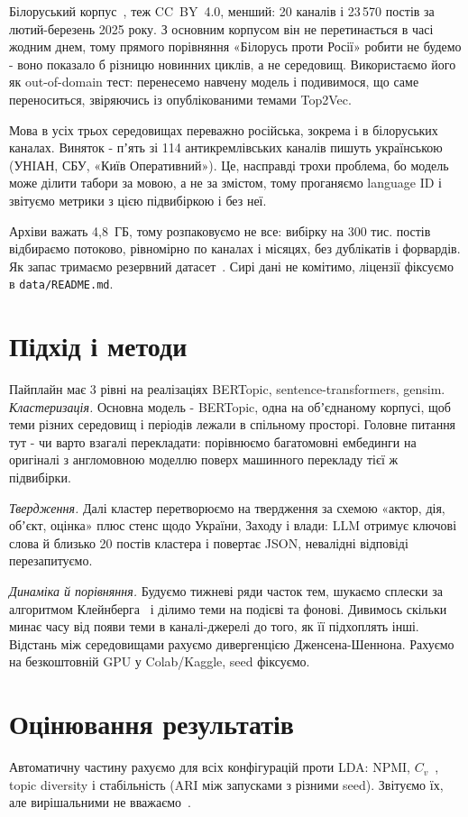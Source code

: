 \documentclass[ukrainian]{ucuproposal}
\begin{document}
Білоруський корпус~\cite{rudnik2026autocrats}, теж CC~BY~4.0, менший: 20
каналів і 23\,570 постів за лютий-березень 2025 року. З основним корпусом
він не перетинається в часі жодним днем, тому прямого порівняння
«Білорусь проти Росії» робити не будемо - воно показало б різницю
новинних циклів, а не середовищ. Використаємо його як out-of-domain тест:
перенесемо навчену модель і подивимося, що саме переноситься, звіряючись
із опублікованими темами Top2Vec.

Мова в усіх трьох середовищах переважно російська, зокрема і в
білоруських каналах. Виняток - пʼять зі 114 антикремлівських каналів
пишуть українською (УНІАН, СБУ, «Київ Оперативний»). Це, насправді трохи проблема, бо модель може ділити табори за мовою, а не за змістом, тому проганяємо language ID і звітуємо метрики з
цією підвибіркою і без неї.

Архіви важать 4,8~ГБ, тому розпаковуємо не все: вибірку на 300 тис.
постів відбираємо потоково, рівномірно по каналах і місяцях, без
дублікатів і форвардів. Як запас тримаємо резервний
датасет~\cite{kyrychenko2025data}. Сирі дані не комітимо, ліцензії
фіксуємо в \texttt{data/README.md}.

\section{Підхід і методи}
Пайплайн має 3 рівні на реалізаціях BERTopic,
sentence-transformers, gensim.
\textit{Кластеризація.} Основна модель - BERTopic, одна
на обʼєднаному корпусі, щоб теми різних середовищ і періодів лежали в
спільному просторі. Головне питання тут - чи варто взагалі перекладати:
порівнюємо багатомовні ембединги на оригіналі з
англомовною моделлю поверх машинного перекладу тієї ж підвибірки.

\textit{Твердження.} Далі кластер перетворюємо на твердження за схемою
«актор, дія, обʼєкт, оцінка» плюс стенс щодо України, Заходу і влади: LLM
отримує ключові слова й близько 20 постів кластера і повертає JSON,
невалідні відповіді перезапитуємо.

\textit{Динаміка й порівняння.} Будуємо тижневі ряди часток тем, шукаємо
сплески за алгоритмом Клейнберга~\cite{kleinberg2002bursts} і ділимо теми
на подієві та фонові. Дивимось скільки
минає часу від появи теми в каналі-джерелі до того, як її підхоплять
інші. Відстань між середовищами рахуємо дивергенцією Дженсена-Шеннона.
Рахуємо на безкоштовній GPU у Colab/Kaggle, seed фіксуємо.

\section{Оцінювання результатів}
Автоматичну частину рахуємо для всіх конфігурацій проти LDA: NPMI,
$C_v$~\cite{roder2015coherence}, topic diversity і стабільність (ARI між
запусками з різними seed). Звітуємо їх, але вирішальними не
вважаємо~\cite{hoyle2021coherence}.
\end{document}
